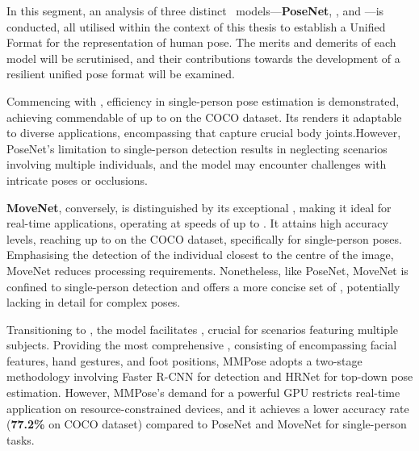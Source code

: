 
\page
In this segment, an analysis of three distinct \HPE\ models—{\bf PoseNet}, , and —is conducted, all utilised within the context of this thesis to establish a Unified Format for the representation of human pose. The merits and demerits of each model will be scrutinised, and their contributions towards the development of a resilient unified pose format will be examined.

Commencing with , efficiency in single-person pose estimation is demonstrated, achieving commendable  of up to  on the COCO dataset. Its  renders it adaptable to diverse applications, encompassing  that capture crucial body joints.\break However, PoseNet's limitation to single-person detection results in neglecting scenarios involving multiple individuals, and the model may encounter challenges with intricate poses or occlusions.

{\bf MoveNet}, conversely, is distinguished by its exceptional , making it ideal for real-time applications, operating at speeds of up to . It attains high accuracy levels, reaching up to  on the COCO dataset, specifically for single-person poses. Emphasising the detection of the individual closest to the centre of the image, MoveNet reduces processing requirements. Nonetheless, like PoseNet, MoveNet is confined to single-person detection and offers a more concise set of , potentially lacking in detail for complex poses.

Transitioning to , the model facilitates , crucial for scenarios featuring multiple subjects. Providing the most comprehensive , consisting of  encompassing facial features, hand gestures, and foot positions, MMPose adopts a two-stage methodology involving Faster R-CNN for detection and HRNet for top-down pose estimation. However, MMPose's demand for a powerful GPU restricts real-time application on resource-constrained devices, and it achieves a lower accuracy rate ({\bf 77.2\%} on COCO dataset) compared to PoseNet and MoveNet for single-person tasks.

